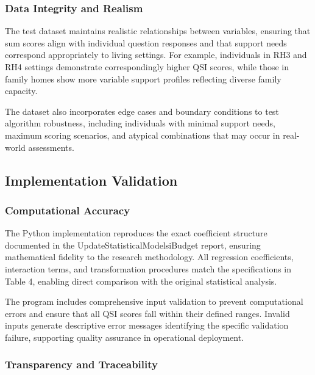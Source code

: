 \subsubsection{Data Integrity and Realism}

The test dataset maintains realistic relationships between variables, ensuring that sum scores align with individual question responses and that support needs correspond appropriately to living settings. For example, individuals in RH3 and RH4 settings demonstrate correspondingly higher QSI scores, while those in family homes show more variable support profiles reflecting diverse family capacity.

The dataset also incorporates edge cases and boundary conditions to test algorithm robustness, including individuals with minimal support needs, maximum scoring scenarios, and atypical combinations that may occur in real-world assessments.

\subsection{Implementation Validation}

\subsubsection{Computational Accuracy}

The Python implementation reproduces the exact coefficient structure documented in the UpdateStatisticalModelsiBudget report, ensuring mathematical fidelity to the research methodology. All regression coefficients, interaction terms, and transformation procedures match the specifications in Table 4, enabling direct comparison with the original statistical analysis.

The program includes comprehensive input validation to prevent computational errors and ensure that all QSI scores fall within their defined ranges. Invalid inputs generate descriptive error messages identifying the specific validation failure, supporting quality assurance in operational deployment.

\subsubsection{Transparency and Traceability}

